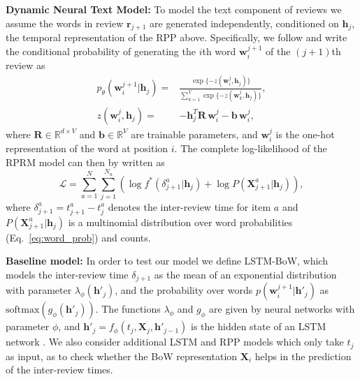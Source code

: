 \documentclass[letterpaper]{article} %
\newcommand{\+}[1]{\boldsymbol{\mathbf{#1}}}
\newcommand*{\Eqref}[1]{Eq.~\eqref{#1}}
\def\*#1{\mathbf{#1}}
\begin{document}
\textbf{Dynamic Neural Text Model:} To model the text component of reviews we assume the words in review $\*r_{j+1}$ are generated independently, conditioned on $\*h_j$, the temporal representation of the RPP above. Specifically, we follow \cite{miao2016neural} and write the conditional probability of generating the $i$th word $\*w^{j+1}_i$ of the $(j+1)$th review as
\begin{align}
    p_\theta(\*w^{j+1}_i|\*h_j) =&  \frac{\exp{\{-z(\*w^j_i,\*h_j)\}}}{\sum_{k=1}^V \exp{\{-z(\*w^j_k,\*h_j)\}}},  \label{eq:word_prob} \\
    z(\*w^j_i,\*h_j) =& -\*h^T_j \*R \, \*w^j_i - \*b \, \*w^j_i,
\end{align}
where $\*R \in \mathbb{R}^{d \times V}$ and $\*b \in \mathbb{R}^V$ are trainable parameters, and $\*w^{j}_i$ is the one-hot representation of the word at position $i$.
The complete log-likelihood of the RPRM model can then by written as
\begin{equation}
    \mathcal{L}=\sum_{a=1}^{N}\sum_{j=1}^{N_a}(\log f^*(\delta^a_{j+1}|\*h_j)+ \log P(\mathbf{X}^a_{j+1}| \*h_j)),
\end{equation}
where $\delta^a_{j+1} = t^a_{j+1}-t^a_j$ denotes the inter-review time for item $a$ and $P(\mathbf{X}^a_{j+1}| \*h_j)$ is a multinomial distribution over word probabilities (\Eqref{eq:word_prob}) and counts.

\textbf{Baseline model:} In order to test our model we define LSTM-BoW, which models the inter-review time $\delta_{j+1}$ as the mean of an exponential distribution with parameter $\lambda_{\phi}(\*h'_j)$, and the probability over words $p(\*w^{j+1}_i|\*h'_j)$ as $\mbox{softmax}(g_{\phi}(\*h'_j))$. The functions $\lambda_{\phi}$ and $g_{\phi}$ are given by neural networks with parameter $\phi$, and $\*h'_j = f_{\phi}(t_{j}, \*X_j, \*h'_{j-1})$ is the hidden state of an LSTM network \cite{LSTM}.
We also consider additional LSTM and RPP models which only take $t_j$ as input, as to check whether the BoW representation $\*X_i$ helps in the prediction of the inter-review times.
\end{document}
